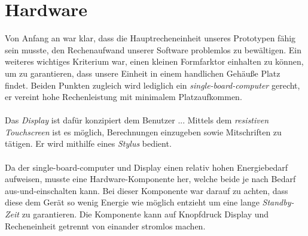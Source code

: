 \section{Hardware}

Von Anfang an war klar, dass die Hauptrecheneinheit unseres Prototypen fähig sein musste, den Rechenaufwand unserer Software problemlos zu bewältigen. Ein weiteres wichtiges Kriterium war, einen kleinen Formfarktor einhalten zu können, um zu garantieren, dass unsere Einheit in einem handlichen Gehäuße Platz findet. Beiden Punkten zugleich wird lediglich ein \textit{single-board-computer} gerecht, er vereint hohe Rechenleistung mit minimalem Platzaufkommen.\\
\\
Das \textit{Display} ist dafür konzipiert dem Benutzer ... Mittels dem \textit{resistiven Touchscreen} ist es möglich, Berechnungen einzugeben sowie Mitschriften zu tätigen. Er wird mithilfe eines \textit{Stylus} bedient.\\
\\
Da der single-board-computer und Display einen relativ hohen Energiebedarf aufweisen, musste eine Hardware-Komponente her, welche beide je nach Bedarf aus-und-einschalten kann. Bei dieser Komponente war darauf zu achten, dass diese dem Gerät so wenig Energie wie möglich entzieht um eine lange \textit{Standby-Zeit} zu garantieren. Die Komponente kann auf Knopfdruck Display und Recheneinheit getrennt von einander stromlos machen.